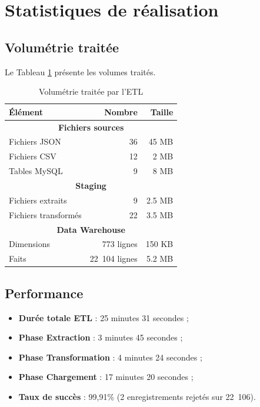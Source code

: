 \documentclass[12pt,a4paper]{report}
\begin{document}
\section{Statistiques de réalisation}

\subsection{Volumétrie traitée}

Le Tableau \ref{tab:volumetrie_etl} présente les volumes traités.

\begin{table}[H]
\centering
\caption{Volumétrie traitée par l'ETL}
\label{tab:volumetrie_etl}
\begin{tabular}{|l|r|r|}
\hline
\textbf{Élément} & \textbf{Nombre} & \textbf{Taille} \\
\hline
\multicolumn{3}{|c|}{\textbf{Fichiers sources}} \\
\hline
Fichiers JSON & 36 & 45 MB \\
Fichiers CSV & 12 & 2 MB \\
Tables MySQL & 9 & 8 MB \\
\hline
\multicolumn{3}{|c|}{\textbf{Staging}} \\
\hline
Fichiers extraits & 9 & 2.5 MB \\
Fichiers transformés & 22 & 3.5 MB \\
\hline
\multicolumn{3}{|c|}{\textbf{Data Warehouse}} \\
\hline
Dimensions & 773 lignes & 150 KB \\
Faits & 22~104 lignes & 5.2 MB \\
\hline
\end{tabular}
\end{table}

\subsection{Performance}

\begin{itemize}
    \item \textbf{Durée totale ETL} : 25 minutes 31 secondes ;
    \item \textbf{Phase Extraction} : 3 minutes 45 secondes ;
    \item \textbf{Phase Transformation} : 4 minutes 24 secondes ;
    \item \textbf{Phase Chargement} : 17 minutes 20 secondes ;
    \item \textbf{Taux de succès} : 99{,}91\% (2 enregistrements rejetés sur 22~106).
\end{itemize}
\end{document}
